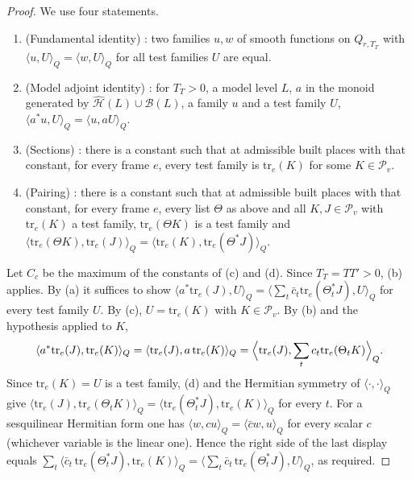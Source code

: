 \begin{proof}
We use four statements.
\begin{enumerate}[label=(\alph*)]
\item (Fundamental identity) : two families
  $u,w$ of smooth functions on $Q_{r,T_T}$ with $\langle u,U\rangle_Q=\langle w,U\rangle_Q$ for all test families $U$ are
  equal.
\item (Model adjoint identity) : for $T_T>0$,
  a model level $L$, $a$ in the monoid generated by $\widehat{\mathcal H}(L)\cup\mathcal B(L)$, a family $u$ and a test family
  $U$, $\langle a^*u,U\rangle_Q=\langle u,aU\rangle_Q$.
\item (Sections) : there is a constant such that
  at admissible built places with that constant, for every frame $e$, every test family is $\mathrm{tr}_e(K)$ for some
  $K\in\mathcal P_v$.
\item (Pairing) : there is a constant such that
  at admissible built places with that constant, for every frame $e$, every list $\Theta$ as above and all
  $K,J\in\mathcal P_v$ with $\mathrm{tr}_e(K)$ a test family, $\mathrm{tr}_e(\Theta K)$ is a test family and
  $\langle\mathrm{tr}_e(\Theta K),\mathrm{tr}_e(J)\rangle_Q=\langle\mathrm{tr}_e(K),\mathrm{tr}_e(\Theta^*J)\rangle_Q$.
\end{enumerate}
Let $C_c$ be the maximum of the constants of (c) and (d). Since $T_T=TT'>0$, (b) applies. By (a) it suffices to show
$\langle a^*\mathrm{tr}_e(J),U\rangle_Q=\langle\sum_t\bar c_t\mathrm{tr}_e(\Theta_t^*J),U\rangle_Q$ for every test family $U$.
By (c), $U=\mathrm{tr}_e(K)$ with $K\in\mathcal P_v$. By (b) and the hypothesis applied to $K$,
\[
\langle a^*\mathrm{tr}_e(J),\mathrm{tr}_e(K)\rangle_Q=\langle\mathrm{tr}_e(J),a\,\mathrm{tr}_e(K)\rangle_Q
=\Bigl\langle\mathrm{tr}_e(J),\sum_tc_t\mathrm{tr}_e(\Theta_tK)\Bigr\rangle_Q .
\]
Since $\mathrm{tr}_e(K)=U$ is a test family, (d) and the Hermitian symmetry of $\langle\cdot,\cdot\rangle_Q$ give
$\langle\mathrm{tr}_e(J),\mathrm{tr}_e(\Theta_tK)\rangle_Q=\langle\mathrm{tr}_e(\Theta_t^*J),\mathrm{tr}_e(K)\rangle_Q$ for every
$t$. For a sesquilinear Hermitian form one has $\langle w,cu\rangle_Q=\langle\bar cw,u\rangle_Q$ for every scalar $c$
(whichever variable is the linear one). Hence the right side of the last display equals
$\sum_t\langle\bar c_t\,\mathrm{tr}_e(\Theta_t^*J),\mathrm{tr}_e(K)\rangle_Q=\langle\sum_t\bar c_t\,\mathrm{tr}_e(\Theta_t^*J),
U\rangle_Q$, as required.
\end{proof}

